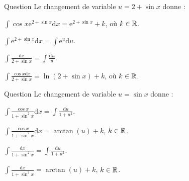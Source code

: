 \begin{multi}[multiple,feedback=
{Avec \(u=2+\sin x\), on a : \(\mathrm{d}u=\cos x\mathrm{d}x\) et puis
\[\int \cos x\mathrm{e}^{2+\sin x}\mathrm{d}x=\int \mathrm{e}^{u}\mathrm{d}u=\mathrm{e}^{u}+k=\mathrm{e}^{2+\sin x}+k,\; k\in \Rr.\]
Ensuite, \(\displaystyle \int \frac{\cos x\mathrm{d}x}{2+\sin x}=\int \frac{\mathrm{d}u}{u}=\ln |u|+k=\ln (2+\sin x)+k\), \(k\in \Rr\).
}]{Question}
Le changement de variable \(u=2+\sin x\) donne :

    \item* \(\displaystyle \int \cos x\mathrm{e}^{2+\sin x}\mathrm{d}x=\mathrm{e}^{2+\sin x}+k\), où \(k\in \Rr\).
    \item \(\displaystyle \int \mathrm{e}^{2+\sin x}\mathrm{d}x=\int \mathrm{e}^u\mathrm{d}u\).
    \item \(\displaystyle \int \frac{\mathrm{d}x}{2+\sin x}=\int \frac{\mathrm{d}u}u\).
    \item* \(\displaystyle \int \frac{\cos x\mathrm{d}x}{2+\sin x}=\ln(2+\sin x)+k\), où \(k\in \Rr\).
\end{multi}


\begin{multi}[multiple,feedback=
{Avec \(u=\sin x\), on aura \(\displaystyle \mathrm{d}u=\cos x\mathrm{d}x\). D'où
\[\int \frac{\cos x}{1+\sin ^2x}\mathrm{d}x=\int \frac{\mathrm{d}u}{1+u^2}=\arctan (u)+k,\; k\in \Rr.\]
}]{Question}
Le changement de variable \(u=\sin x\) donne :

    \item* \(\displaystyle \int \frac{\cos x}{1+\sin ^2x}\mathrm{d}x=\int \frac{\mathrm{d}u}{1+u^2}\).
    \item* \(\displaystyle \int \frac{\cos x}{1+\sin ^2x}\mathrm{d}x=\arctan (u)+k\), \(k\in \Rr\).
    \item \(\displaystyle \int \frac{\mathrm{d}x}{1+\sin ^2x}=\int \frac{\mathrm{d}u}{1+u^2}\).
    \item \(\displaystyle \int \frac{\mathrm{d}x}{1+\sin ^2x}=\arctan (u)+k\), \(k\in \Rr\).
\end{multi}



